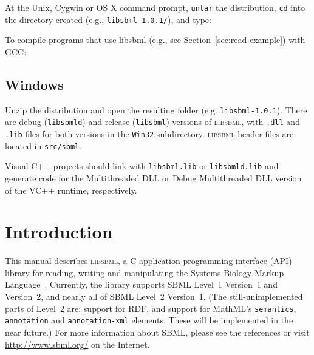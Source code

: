 \documentclass{sbmlmanual}
\begin{document}
At the Unix, Cygwin or OS X command prompt, \texttt{untar} the
distribution, \texttt{cd} into the directory created (e.g.,
\texttt{libsbml-1.0.1/}), and type:

\begin{example}[csh]
\end{example}

To compile programs that use libsbml (e.g., see
Section~\ref{sec:read-example}) with GCC:

\begin{example}[csh]
\end{example}


\subsection{Windows}

Unzip the distribution and open the resulting folder
(e.g. \texttt{libsbml-1.0.1}).  There are debug (\texttt{libsbmld})
and release (\texttt{libsbml}) versions of \textsc{libsbml}, with
\texttt{.dll} and \texttt{.lib} files for both versions in the
\texttt{Win32} subdirectory.  \textsc{libsbml} header files are
located in \texttt{src/sbml}.

Visual C++ projects should link with \texttt{libsbml.lib} or
\texttt{libsbmld.lib} and generate code for the Multithreaded DLL or
Debug Multithreaded DLL version of the VC++ runtime, respectively.


\section{Introduction}
\label{sec:introduction}

This manual describes \textsc{libsbml}, a C application programming
interface (API) library for reading, writing and manipulating the Systems
Biology Markup
Language~\citep[SBML;][]{hucka:2001,hucka:2003,finney:2003c}.  Currently,
the library supports SBML Level~1 Version~1 and Version~2, and nearly all
of SBML Level~2 Version~1.  (The still-unimplemented parts of Level~2 are:
support for RDF, and support for MathML's \texttt{semantics},
\texttt{annotation} and \texttt{annotation-xml} elements.  These will be
implemented in the near future.)  For more information about SBML, please
see the references or visit \url{http://www.sbml.org/} on the Internet.
\end{document}
